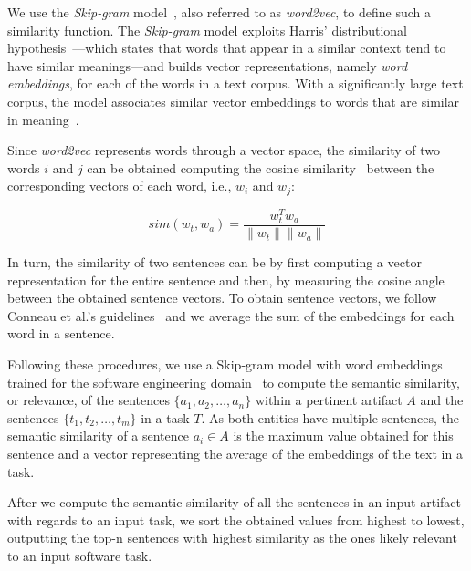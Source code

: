 



We use the \textit{Skip-gram} model~\cite{Mikolov2013}, also referred to as \textit{word2vec}, to define such a similarity function.
The \textit{Skip-gram} model exploits Harris' distributional hypothesis~\cite{harris1954distributional}---which states that words that appear in a similar context tend to have similar meanings---and builds vector representations, namely \textit{word embeddings}, for each of the words in a text corpus.
With a significantly large text corpus, the model associates similar vector embeddings to words that are similar in meaning~\cite{Ye2016}.


Since \textit{word2vec} represents words through a vector space, the similarity of two words $i$ and $j$ can be obtained computing the cosine similarity~\cite{Manning2009IR} between the corresponding vectors of each word, i.e., $w_i$ and $w_j$:

\begin{equation}
    sim(w_t,w_a) = \frac{w_t^Tw_a}{\|w_t\| \|w_a\|}
    \label{eq:word-sim}
\end{equation}
 
\smallskip
In turn, the similarity of two sentences can be  by first computing a vector representation for the entire sentence and then, by measuring the cosine angle between the obtained sentence vectors.
To obtain sentence vectors, we follow Conneau et al.'s guidelines~\cite{conneau2018}
and we average the sum of the embeddings for each word in a sentence.




Following these procedures, we use a Skip-gram model with word embeddings trained for the software engineering domain~\cite{Efstathiou2018} to compute the semantic similarity, or relevance, of the sentences $\{a_1, a_2, \dots, a_n\}$ within a pertinent artifact $A$ and the sentences $\{t_1, t_2, \dots, t_m\}$ in a task  $T$. As both entities have multiple sentences, the semantic similarity of a sentence $a_i \in A$ is the maximum value obtained for this sentence and 
a vector representing the average of the embeddings of the text in a task.


After we compute the semantic similarity of all the sentences in an input artifact with regards to an input task, we sort the obtained values from highest to lowest, outputting the top-n sentences with highest similarity as the ones likely relevant to an input software task.


